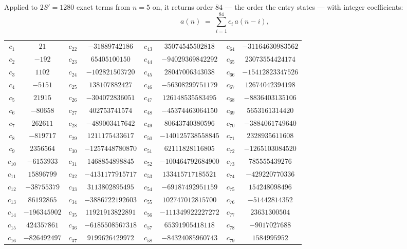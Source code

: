\documentclass[11pt,a4paper]{article}
\theoremstyle{plain}
\theoremstyle{definition}
\begin{document}
Applied to $2S'=1280$ exact terms from $n=5$ on, it returns order $84$ --- the
order the entry states --- with integer coefficients:
\[
a(n)\;=\;\sum_{i=1}^{84}c_i\,a(n-i),
\]
\begin{center}\small
\begin{tabular}{cccccccc}
$c_{1}$ & $21$ & $c_{22}$ & $-31889742186$ & $c_{43}$ & $35074545502818$ & $c_{64}$ & $-31164630983562$ \\
$c_{2}$ & $-192$ & $c_{23}$ & $65405100150$ & $c_{44}$ & $-94029369842292$ & $c_{65}$ & $23073554424174$ \\
$c_{3}$ & $1102$ & $c_{24}$ & $-102821503720$ & $c_{45}$ & $28047006343038$ & $c_{66}$ & $-15412823347526$ \\
$c_{4}$ & $-5151$ & $c_{25}$ & $138107882427$ & $c_{46}$ & $-56308299751179$ & $c_{67}$ & $12674042394198$ \\
$c_{5}$ & $21915$ & $c_{26}$ & $-304072836051$ & $c_{47}$ & $126148535583495$ & $c_{68}$ & $-8836403135106$ \\
$c_{6}$ & $-80658$ & $c_{27}$ & $402753741574$ & $c_{48}$ & $-45374463064150$ & $c_{69}$ & $5653161314420$ \\
$c_{7}$ & $262611$ & $c_{28}$ & $-489003417642$ & $c_{49}$ & $80643740380596$ & $c_{70}$ & $-3884061749640$ \\
$c_{8}$ & $-819717$ & $c_{29}$ & $1211175433617$ & $c_{50}$ & $-140125738558845$ & $c_{71}$ & $2328935611608$ \\
$c_{9}$ & $2356564$ & $c_{30}$ & $-1257448780870$ & $c_{51}$ & $62111828116805$ & $c_{72}$ & $-1265103084520$ \\
$c_{10}$ & $-6153933$ & $c_{31}$ & $1468854898845$ & $c_{52}$ & $-100464792684900$ & $c_{73}$ & $785555439276$ \\
$c_{11}$ & $15896799$ & $c_{32}$ & $-4131177915717$ & $c_{53}$ & $133415717185521$ & $c_{74}$ & $-429220770336$ \\
$c_{12}$ & $-38755379$ & $c_{33}$ & $3113802895495$ & $c_{54}$ & $-69187492951159$ & $c_{75}$ & $154248098496$ \\
$c_{13}$ & $86192865$ & $c_{34}$ & $-3886722192603$ & $c_{55}$ & $102747012815700$ & $c_{76}$ & $-51442814352$ \\
$c_{14}$ & $-196345902$ & $c_{35}$ & $11921913822891$ & $c_{56}$ & $-111349922227272$ & $c_{77}$ & $23631300504$ \\
$c_{15}$ & $424357861$ & $c_{36}$ & $-6185508567318$ & $c_{57}$ & $65391905418118$ & $c_{78}$ & $-9017027688$ \\
$c_{16}$ & $-826492497$ & $c_{37}$ & $9199626429972$ & $c_{58}$ & $-84324085960743$ & $c_{79}$ & $1584995952$ \\

\end{tabular}
\end{center}
\end{document}
